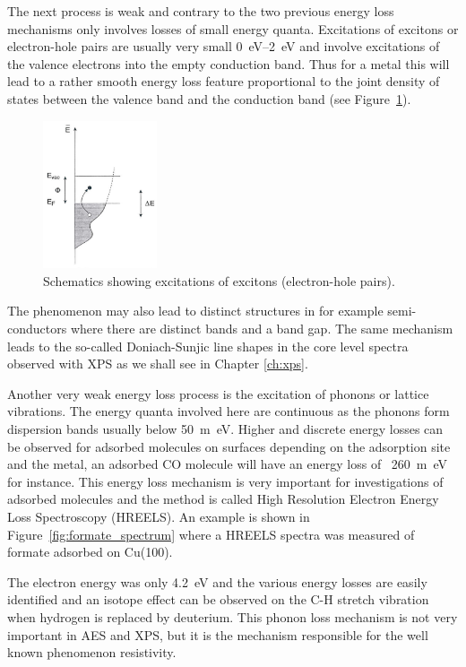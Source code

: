 The next process is weak and contrary to the two previous energy loss mechanisms only involves losses of small energy quanta. Excitations of excitons or electron-hole pairs are usually very small \SIrange{0}{2}{\electronvolt} and involve excitations of the valence electrons into the empty conduction band. Thus for a metal this will lead to a rather smooth energy loss feature proportional to the joint density of states between the valence band and the conduction band (see Figure~\ref{fig:schem_exitons}).

\begin{figure}[htbp]
\centering
\includegraphics[width=0.3\textwidth]{figures/02_12}
\caption{Schematics showing excitations of excitons (electron-hole pairs).}
\label{fig:schem_exitons}
\end{figure}

The phenomenon may also lead to distinct structures in for example semi-conductors where there are distinct bands and a band gap. The same mechanism leads to the so-called Doniach-Sunjic line shapes in the core level spectra observed with XPS as we shall see in Chapter \ref{ch:xps}.

Another very weak energy loss process is the excitation of phonons or lattice vibrations. The energy quanta involved here are continuous as the phonons form dispersion bands usually below \SI{50}{m\electronvolt}. Higher and discrete energy losses can be observed for adsorbed molecules on surfaces depending on the adsorption site and the metal, an adsorbed CO molecule will have an energy loss of ~\SI{260}{m\electronvolt} for instance. This energy loss mechanism is very important for investigations of adsorbed molecules and the method is called High Resolution Electron Energy Loss Spectroscopy (HREELS). An example is shown in Figure~\ref{fig:formate_spectrum} where a HREELS spectra was measured of formate adsorbed on Cu(100).

The electron energy was only \SI{4.2}{\electronvolt} and the various energy losses are easily identified and an isotope effect can be observed on the C-H stretch vibration when hydrogen is replaced by deuterium. This phonon loss mechanism is not very important in AES and XPS, but it is the mechanism responsible for the well known phenomenon resistivity.

